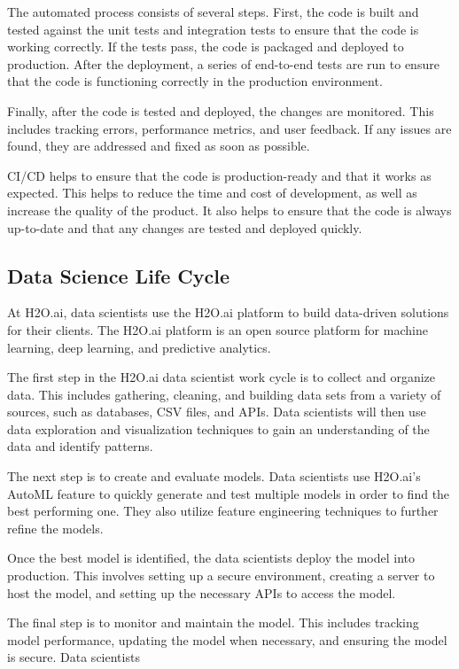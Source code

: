 \documentclass[12pt,a4paper]{report}
\begin{document}
The automated process consists of several steps. First, the code is built and tested against the unit tests and integration tests to ensure that the code is working correctly. If the tests pass, the code is packaged and deployed to production. After the deployment, a series of end-to-end tests are run to ensure that the code is functioning correctly in the production environment.

Finally, after the code is tested and deployed, the changes are monitored. This includes tracking errors, performance metrics, and user feedback. If any issues are found, they are addressed and fixed as soon as possible.

CI/CD helps to ensure that the code is production-ready and that it works as expected. This helps to reduce the time and cost of development, as well as increase the quality of the product. It also helps to ensure that the code is always up-to-date and that any changes are tested and deployed quickly.

\subsection*{Data Science Life Cycle}

At H2O.ai, data scientists use the H2O.ai platform to build data-driven solutions for their clients. The H2O.ai platform is an open source platform for machine learning, deep learning, and predictive analytics.

The first step in the H2O.ai data scientist work cycle is to collect and organize data. This includes gathering, cleaning, and building data sets from a variety of sources, such as databases, CSV files, and APIs. Data scientists will then use data exploration and visualization techniques to gain an understanding of the data and identify patterns.

The next step is to create and evaluate models. Data scientists use H2O.ai's \ac{AutoML} feature to quickly generate and test multiple models in order to find the best performing one. They also utilize feature engineering techniques to further refine the models.

Once the best model is identified, the data scientists deploy the model into production. This involves setting up a secure environment, creating a server to host the model, and setting up the necessary APIs to access the model.

The final step is to monitor and maintain the model. This includes tracking model performance, updating the model when necessary, and ensuring the model is secure. Data scientists
\end{document}
